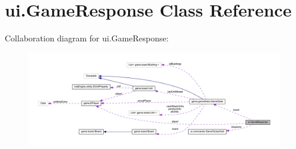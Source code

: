 \hypertarget{classui_1_1_game_response}{}\section{ui.\+Game\+Response Class Reference}
\label{classui_1_1_game_response}


Collaboration diagram for ui.\+Game\+Response\+:
\nopagebreak
\begin{figure}[H]
\begin{center}
\leavevmode
\includegraphics[width=350pt]{classui_1_1_game_response__coll__graph}
\end{center}
\end{figure}
